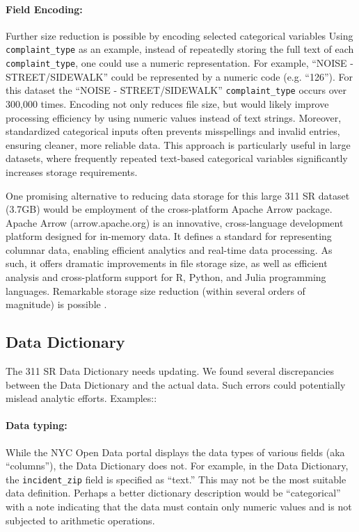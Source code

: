 \documentclass[linenumber]{jdsart}
\begin{document}
\paragraph{Field Encoding:} Further size reduction is possible 
by encoding selected categorical variables 
Using \texttt{complaint\_type} as an example,
instead of repeatedly storing the full text of each \texttt{complaint\_type}, 
one could use a numeric representation. For example, 
``NOISE - STREET/SIDEWALK'' could be represented by a 
numeric code (e.g. ``126''). For this dataset the 
``NOISE - STREET/SIDEWALK'' \texttt{complaint\_type} occurs 
over 300,000 times. Encoding not only reduces file 
size, but would likely improve processing efficiency by using numeric
values instead of text strings. Moreover, standardized 
categorical inputs often prevents misspellings 
and invalid entries, ensuring cleaner, more reliable 
data. This approach is particularly useful in large datasets, where 
frequently repeated text-based categorical variables significantly 
increases storage requirements.


One promising alternative to reducing data storage  
for this large 311 SR dataset (3.7GB) would be employment of 
the cross-platform Apache Arrow package. Apache Arrow (arrow.apache.org) 
is an innovative, cross-language development platform designed for 
in-memory data. It defines a standard for representing columnar data, 
enabling efficient analytics and real-time data processing. As such,
it offers dramatic improvements in file storage size, as well as 
efficient analysis and cross-platform support for R, Python, 
and Julia programming languages. Remarkable storage size 
reduction (within several orders of magnitude) is possible \citep{bates2024csv}.


\subsection{Data Dictionary} 
\label{sec:datadictionary}

The 311 SR Data Dictionary needs updating. We found several 
discrepancies between the Data Dictionary and the actual
data. Such errors could potentially mislead analytic efforts. Examples::


\paragraph{Data typing:} While the NYC Open Data portal displays the data types of 
various fields (aka ``columns''), the Data Dictionary does 
not. For example, in the Data Dictionary, 
the \texttt{incident\_zip} field is specified as ``text.'' This may 
not be the most suitable data definition. Perhaps a better 
dictionary description would be  ``categorical'' with a note 
indicating that the data must contain only numeric values 
and is not subjected to arithmetic operations.
\end{document}
